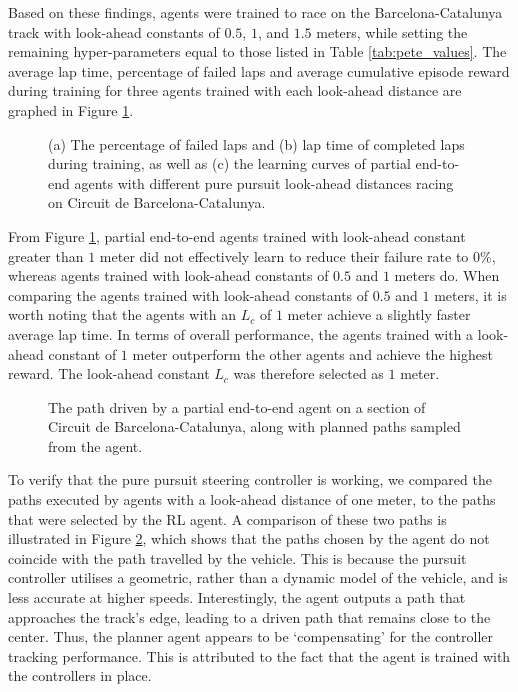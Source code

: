 Based on these findings, agents were trained to race on the Barcelona-Catalunya track with look-ahead constants of $0.5$, $1$, and $1.5$ meters, while setting the remaining hyper-parameters equal to those listed in Table \ref{tab:pete_values}.
The average lap time, percentage of failed laps and average cumulative episode reward during training for three agents trained with each look-ahead distance are graphed in Figure \ref{fig:lfc_curves}.

\begin{figure}[t]
    \centering
    
    \caption[Learning curves for tuning the steering controller look-ahead constant of a partial end-to-end agent]{(a) The percentage of failed laps and (b) lap time of completed laps during training, as well as (c) the learning curves of partial end-to-end agents with different pure pursuit look-ahead distances racing on Circuit de Barcelona-Catalunya.}
    \label{fig:lfc_curves}
\end{figure}

From Figure \ref{fig:lfc_curves}, partial end-to-end agents trained with look-ahead constant greater than $1$ meter did not effectively learn to reduce their failure rate to $0\%$, whereas agents trained with  look-ahead constants of $0.5$ and $1$ meters do.
When comparing the agents trained with look-ahead constants of $0.5$ and $1$ meters, it is worth noting that the agents with an $L_c$ of $1$ meter achieve a slightly faster average lap time. 
In terms of overall performance, the agents trained with a look-ahead constant of $1$ meter outperform the other agents and achieve the highest reward.
The look-ahead constant $L_c$ was therefore selected as $1$ meter.

\begin{figure}[b]
    \centering
    
    \caption[The path driven by a partial end-to-end agent on a section of Circuit de Barcelona-Catalunya]{The path driven by a partial end-to-end agent on a section of Circuit de Barcelona-Catalunya, along with planned paths sampled from the agent.}
    \label{fig:lfc_paths}
\end{figure}


To verify that the pure pursuit steering controller is working, we compared the paths executed by agents with a look-ahead distance of one meter, to the paths that were selected by the RL agent.
A comparison of these two paths is illustrated in Figure \ref{fig:lfc_paths}, which shows that the paths chosen by the agent do not coincide with the path travelled by the vehicle.
This is because the pursuit controller utilises a geometric, rather than a dynamic model of the vehicle, and is less accurate at higher speeds.
Interestingly, the agent outputs a path that approaches the track's edge, leading to a driven path that remains close to the center.
Thus, the planner agent appears to be `compensating' for the controller tracking performance.
This is attributed to the fact that the agent is trained with the controllers in place.





